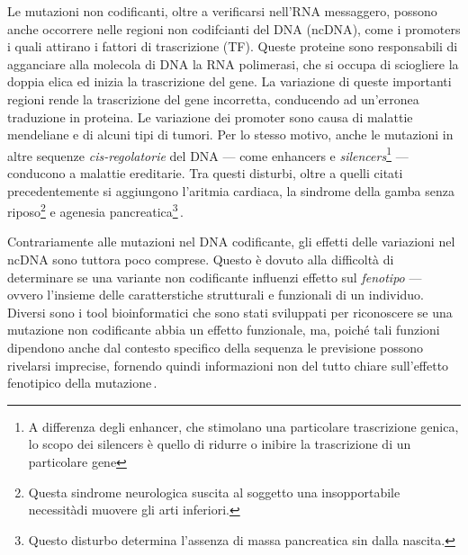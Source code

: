 Le mutazioni non codificanti, oltre a verificarsi nell'\acs{RNA} messaggero, possono anche occorrere nelle regioni non codifcianti del \acs{DNA} (\acs{ncDNA}), come i promoters i quali attirano i fattori di trascrizione (\acs{TF}). Queste proteine sono responsabili di agganciare alla molecola di \acs{DNA} la \acs{RNA} polimerasi, che si occupa di sciogliere la doppia elica ed inizia la trascrizione del gene. La variazione di queste importanti regioni rende la trascrizione del gene incorretta, conducendo ad un'erronea traduzione in proteina. Le variazione dei promoter sono causa di malattie mendeliane e di alcuni tipi di tumori. Per lo stesso motivo, anche le mutazioni in altre sequenze \textsl{cis-regolatorie} del \acs{DNA} — come enhancers e \textit{silencers}\footnote{A differenza degli enhancer, che stimolano una particolare trascrizione genica, lo scopo dei silencers è quello di ridurre o inibire la trascrizione di un particolare gene} — conducono a malattie ereditarie. Tra questi disturbi, oltre a quelli citati precedentemente si aggiungono l'aritmia cardiaca, la sindrome della gamba senza riposo\footnote{Questa sindrome neurologica suscita al soggetto una insopportabile necessitàdi muovere gli arti inferiori.} e agenesia pancreatica\footnote{Questo disturbo determina l'assenza di massa pancreatica sin dalla nascita.}\,\cite{zhang2015non, french2020role, pagni2022non, khurana2016role}.

Contrariamente alle mutazioni nel \acs{DNA} codificante, gli effetti delle variazioni nel \acs{ncDNA} sono tuttora poco comprese. Questo è dovuto alla difficoltà di determinare se una variante non codificante influenzi effetto sul \textsl{fenotipo} — ovvero l'insieme delle caratterstiche strutturali e funzionali di un individuo. Diversi sono i tool bioinformatici che sono stati sviluppati per riconoscere se una mutazione non codificante abbia un effetto funzionale, ma, poiché tali funzioni dipendono anche dal contesto specifico della sequenza le previsione possono rivelarsi imprecise, fornendo quindi informazioni non del tutto chiare sull'effetto fenotipico della mutazione\,\cite{schipper2022demystifying, pena2024decoding}. 

